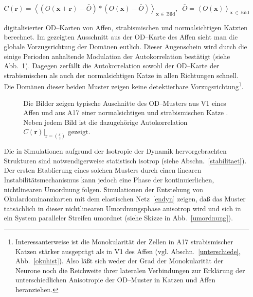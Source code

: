 \begin{small}
\begin{equation}
C(\mathbf{r})=\left<\left(O(\mathbf{x+r})-\bar{O}\right)\ast\left(O(\mathbf{x})-\bar{O}\right)\right>_{\mathbf{x}\,\in\,\text{Bild}},\;\;\bar{O}=\left<O(\mathbf{x})\right>_{\mathbf{x}\,\in\,\text{Bild}}
\label{autocorr}
\end{equation}
\end{small}

\noindent digitalisierter OD--Karten von Affen, strabismischen und
normalsichtigen Katzten berechnet.  Im gezeigten Ausschnitt aus der
OD--Karte des Affen sieht man die globale Vorzugsrichtung der Domänen
eutlich.  Dieser Augenschein wird durch die einige Perioden anhaltende
Modulation der Autokorrelation bestätigt (siehe Abb.~\ref{odcorr}).
Dagegen zerfällt die Autokorrelation sowohl der OD--Karte der
strabismischen als auch der normalsichtigen Katze in allen Richtungen
schnell. Die Domänen dieser beiden Muster zeigen keine detektierbare
Vorzugsrichtung\footnote{Interessanterweise ist die Monokularität der
Zellen in A17 strabismischer Katzen stärker ausgeprägt als in V1 des
Affen (vgl. Abschn.~\ref{unterschiede}, Abb.~\ref{okuhist}).  Also läßt
sich weder der Grad der Monokularität der Neurone noch die Reichweite
ihrer lateralen Verbindungen zur Erklärung der unterschiedlichen
Anisotropie der OD--Muster in Katzen und Affen heranziehen.}.
\setcounter{footnote}{1}

\begin{figure}[h!]
\begin{center}
\end{center}
\caption{Die Bilder zeigen typische Auschnitte des OD--Musters aus V1 eines
Affen \protect{} und aus A17 einer normalsichtigen und strabismischen Katze
\protect{}. Neben jedem Bild ist die dazugehörige Autokorrelation
$C(\mathbf{r})\vert_{\mathbf{r}={\binom{x}{0}}}$ gezeigt.}
\label{odcorr}
\end{figure}

Die in Simulationen aufgrund der Isotropie der Dynamik
hervorgebrachten Strukturen sind notwendigerweise statistisch isotrop
(siehe Abschn.~\ref{stabilitaet}).  Der ersten Etablierung eines solchen
Musters durch einen linearen Instabilitätsmechanismus kann jedoch
eine Phase der kontinuierlichen, nichtlinearen Umordnung folgen.  Simulationen der Entstehung von Okulardominanzkarten mit
dem elastischen Netz~\eqref{endyn} zeigen, daß das Muster tatsächlich in
dieser nichtlinearen Umordnungsphase anisotrop wird und sich in ein System
paralleler Streifen umordnet (siehe Skizze in
Abb.~\ref{umordnung}).

